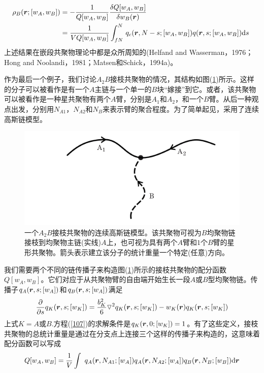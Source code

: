 \begin{equation}
\begin{aligned}
\rho _B(\bm{r};[w_A,w_B]) & =-\frac{1}{Q[w_A,w_B]}	\frac{\delta Q[w_A,w_B]}{\delta w_B(\bm{r})} \\
& =\frac{1}{VQ[w_A,w_B]} \int _{fN}^{N}\,q_c(\bm{r},N-s;[w_A,w_B])q(\bm{r},s;[w_A,w_B])\mathrm{d}s~ \\
\end{aligned}	
\end{equation}
上述结果在嵌段共聚物理论中都是众所周知的(Helfand and Wasserman，1976；Hong and Noolandi，1981；Matsen和Schick，1994a)。

作为最后一个例子，我们讨论$A_2B$接枝共聚物的情况，其结构如图(\ref{3.8})所示。这样的分子可以被看作是有一个$A$主链与一个单一的$B$块“嫁接”到它。或者，该共聚物可以被看作是一种星共聚物有两个$A$臂，分别是$A_1$和$A_2$，和一个$B$臂。从后一种观点出发，分别用$N_{A1}$，$N_{A2}$和$N_B$来表示臂的聚合程度。为了简单起见，采用了连续高斯链模型。

\begin{figure}[H]
\centering
\includegraphics[scale=0.7]{./figures/38.png}
\caption{一个$A_2B$接枝共聚物的连续高斯链模型。该共聚物可视为$B$均聚物链接枝到均聚物主链(实线)$A$上，也可视为具有两个$A$臂和$1$个$B$臂的星形共聚物。箭头表示建立该分子的统计重量一个特定(任意)方向。}
\label{3.8}
\end{figure}		

我们需要两个不同的链传播子来构造图(\ref{3.8})所示的接枝共聚物的配分函数$Q[w_A,w_B]$。它们对应于从共聚物臂的自由端开始生长一段$A$或$B$型均聚物链。传播子$q_A(\bm{r},s;[w_A])$和$q_B(\bm{r},s;[w_A])$满足
\begin{equation}
\frac{\partial}{\partial s}q_K(\bm{r},s;[w_K])=\frac{b_K^2}{6}\triangledown ^2q_K(\bm{r},s;[w_K])-w_K(\bm{r})q_K(\bm{r},s;[w_K]) \label{107}
\end{equation}
上式$K=A$或$B$.方程(\ref{107})的求解条件是$q_K(\bm{r},0;[w_K])=1$。有了这些定义，接枝共聚物的总统计重量是通过在分支点上连接三个这样的传播子来构造的，这意味着配分函数可以写成
\begin{equation}
Q[w_A,w_B]=\frac{1}{V}\int ~q_A(\bm{r},N_{A1};[w_A])q_A(\bm{r},N_{A2};[w_A])q_B(\bm{r},N_B;[w_B]) \mathrm{d}\bm{r}
\end{equation}

